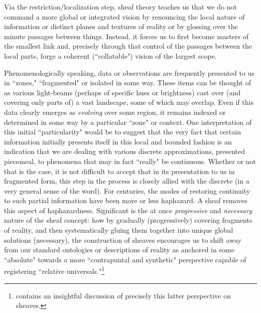 \documentclass[a4paper]{book}
\theoremstyle{definition}
\theoremstyle{definition}
\theoremstyle{definition}
\theoremstyle{theorem}
\theoremstyle{definition}
\begin{document}
Via the restriction/localization step, sheaf theory teaches us that we do not command a more global or integrated vision by renouncing the local nature of information or distinct planes and textures of reality or by glossing over the minute passages between things. Instead, it forces us to first become masters of the smallest link and, precisely through that control of the passages between the local parts, forge a coherent (``collatable") vision of the largest scope. \par 
Phenomenologically speaking, data or observations are frequently presented to us in ``zones," ``fragmented" or isolated in some way. These items can be thought of as various light-beams (perhaps of specific hues or brightness) cast over (and covering only parts of) a vast landscape, some of which may overlap. Even if this data clearly emerges as \textit{evolving} over some region, it remains indexed or determined in some way by a particular ``zone" or context. One interpretation of this initial ``particularity" would be to suggest that the very fact that certain information initially presents itself in this local and bounded fashion is an indication that we are dealing with various discrete approximations, presented piecemeal, to phenomena that may in fact ``really" be continuous. Whether or not that is the case, it is not difficult to accept that in its presentation to us in fragmented form, this step in the process is closely allied with the discrete (in a very general sense of the word). For centuries, the modes of restoring continuity to such partial information have been more or less haphazard. A sheaf removes this aspect of haphazardness. Significant is the at once \textit{progressive} and \textit{necessary} nature of the sheaf concept: how by gradually (progressively) covering fragments of reality, and then systematically gluing them together into unique global solutions (necessary), the construction of sheaves encourages us to shift away from our standard ontologies or descriptions of reality as anchored in some ``absolute" towards a more ``contrapuntal and synthetic" perspective capable of registering ``relative universals."\footnote{\cite{zalamea_synthetic_2013} contains an insightful discussion of precisely this latter perspective on sheaves.}\par 
\end{document}
